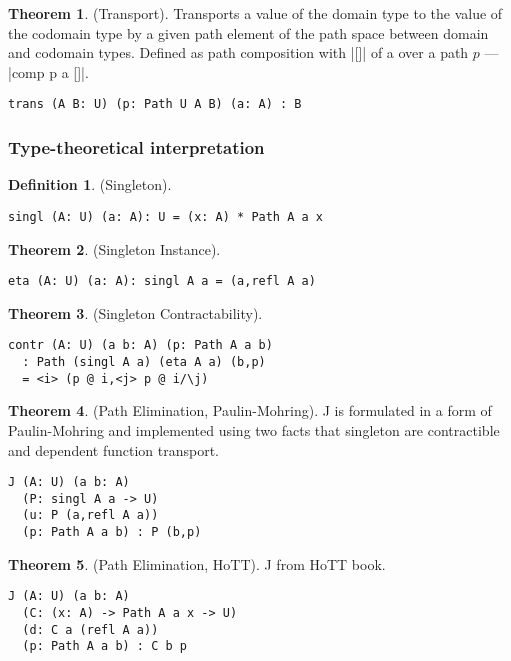 \documentclass{article}
\theoremstyle{definition}
\newtheorem{theorem}{Theorem}
\newtheorem{definition}{Definition}
\begin{document}
\begin{theorem} (Transport).
Transports a value of the domain type to the value of the codomain type
by a given path element of the path space between domain and codomain types.
Defined as path composition with |[]| of a over a path $p$ --- |comp p a []|.
\begin{lstlisting}
trans (A B: U) (p: Path U A B) (a: A) : B
\end{lstlisting}
\end{theorem}

\subsubsection*{Type-theoretical interpretation}
\begin{definition} (Singleton).
\begin{lstlisting}
singl (A: U) (a: A): U = (x: A) * Path A a x
\end{lstlisting}
\end{definition}

\begin{theorem} (Singleton Instance).
\begin{lstlisting}
eta (A: U) (a: A): singl A a = (a,refl A a)
\end{lstlisting}
\end{theorem}

\begin{theorem} (Singleton Contractability).
\begin{lstlisting}
contr (A: U) (a b: A) (p: Path A a b)
  : Path (singl A a) (eta A a) (b,p)
  = <i> (p @ i,<j> p @ i/\j)
\end{lstlisting}
\end{theorem}

\begin{theorem} (Path Elimination, Paulin-Mohring).
J is formulated in a form of Paulin-Mohring and implemented using
two facts that singleton are contractible and dependent function
transport.
\begin{lstlisting}
J (A: U) (a b: A)
  (P: singl A a -> U)
  (u: P (a,refl A a))
  (p: Path A a b) : P (b,p)
\end{lstlisting}
\end{theorem}

\begin{theorem} (Path Elimination, HoTT).
J from HoTT book.
\begin{lstlisting}
J (A: U) (a b: A)
  (C: (x: A) -> Path A a x -> U)
  (d: C a (refl A a))
  (p: Path A a b) : C b p
\end{lstlisting}
\end{theorem}
\end{document}
